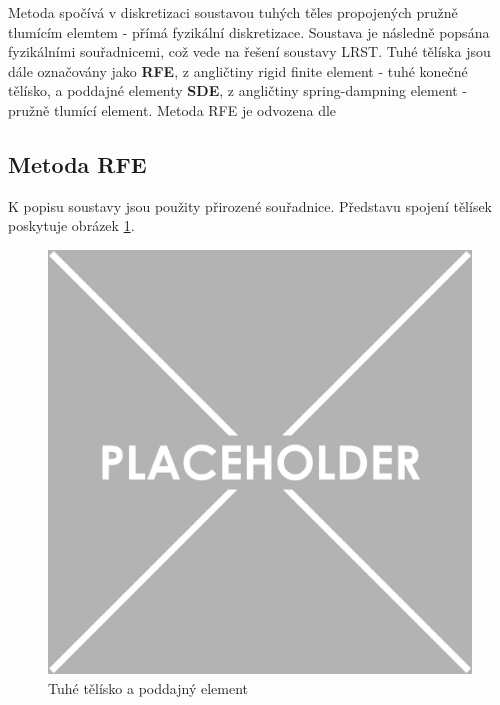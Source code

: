 Metoda spočívá v diskretizaci soustavou tuhých těles propojených pružně tlumícím elemtem - přímá fyzikální diskretizace. Soustava je následně popsána fyzikálními souřadnicemi, což vede na řešení soustavy LRST. Tuhé tělíska jsou dále označovány jako \textbf{RFE}, z angličtiny rigid finite element - tuhé konečné tělísko, a poddajné elementy \textbf{SDE}, z angličtiny spring-dampning element - pružně tlumící element. Metoda RFE je odvozena dle \cite{cite:RFE_Vamp, cite:RFE}

\subsection{Metoda RFE}

K popisu soustavy jsou použity přirozené souřadnice. Představu spojení tělísek poskytuje obrázek \ref{fig:RFE_SDE}.
\begin{figure}[H]
	\centering
	\includegraphics[width=0.7\linewidth]{img/placeholder.pdf}
	\caption{Tuhé tělísko a poddajný element}
	\label{fig:RFE_SDE}
\end{figure}


